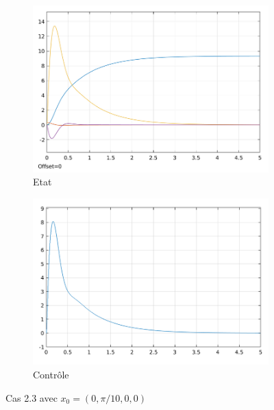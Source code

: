 \documentclass[a4paper]{article}
\begin{document}
                        \begin{figure}[h!]
                                \centering
                                \begin{subfigure}[b]{0.45\textwidth}
                                        \includegraphics[width=\textwidth]{images/courbe_cas_2_3_TP03.png}
                                        \caption{Etat}
                                        \label{fig3.10.1}
                                \end{subfigure}
                                \hspace{30pt}
                                \begin{subfigure}[b]{0.45\textwidth}
                                        \includegraphics[width=\textwidth]{images/controle_cas_2_3_TP03.png}
                                        \caption{Contrôle}
                                        \label{fig3.10.2}
                                \end{subfigure}
                                \caption{Cas 2.3 avec $x_0=(0,\pi/10,0,0)$}
                                \label{fig3.10}
                        \end{figure}
\end{document}
